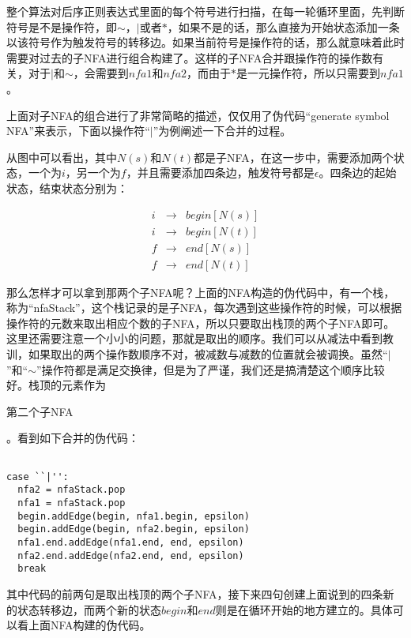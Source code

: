 整个算法对后序正则表达式里面的每个符号进行扫描，在每一轮循环里面，先判断符号是不是操作符，即$\sim$，$|$或者$*$，如果不是的话，那么直接为开始状态添加一条以该符号作为触发符号的转移边。如果当前符号是操作符的话，那么就意味着此时需要对过去的子NFA进行组合构建了。这样的子NFA合并跟操作符的操作数有关，对于$|$和$\sim$，会需要到$nfa1$和$nfa2$，而由于$*$是一元操作符，所以只需要到$nfa1$。

上面对子NFA的组合进行了非常简略的描述，仅仅用了伪代码“generate symbol NFA”来表示，下面以操作符“$|$”为例阐述一下合并的过程。



从图中可以看出，其中$N(s)$和$N(t)$都是子NFA，在这一步中，需要添加两个状态，一个为$i$，另一个为$f$，并且需要添加四条边，触发符号都是$\epsilon$。四条边的起始状态，结束状态分别为：

\begin{center}
\begin{eqnarray*}
     i & \rightarrow & begin[N(s)] \\
     i & \rightarrow & begin[N(t)] \\
     f & \rightarrow & end[N(s)] \\
     f & \rightarrow & end[N(t)] 
\end{eqnarray*}
\end{center}

\newpage

那么怎样才可以拿到那两个子NFA呢？上面的NFA构造的伪代码中，有一个栈，称为“nfaStack”，这个栈记录的是子NFA，每次遇到这些操作符的时候，可以根据操作符的元数来取出相应个数的子NFA，所以只要取出栈顶的两个子NFA即可。这里还需要注意一个小小的问题，那就是取出的顺序。我们可以从减法中看到教训，如果取出的两个操作数顺序不对，被减数与减数的位置就会被调换。虽然“$|$”和“$\sim$”操作符都是满足交换律，但是为了严谨，我们还是搞清楚这个顺序比较好。栈顶的元素作为\begin{bfseries}第二个子NFA\end{bfseries}。看到如下合并的伪代码：

\begin{verbatim}

case ``|'':
  nfa2 = nfaStack.pop
  nfa1 = nfaStack.pop
  begin.addEdge(begin, nfa1.begin, epsilon)
  begin.addEdge(begin, nfa2.begin, epsilon)
  nfa1.end.addEdge(nfa1.end, end, epsilon)
  nfa2.end.addEdge(nfa2.end, end, epsilon)
  break

\end{verbatim}

其中代码的前两句是取出栈顶的两个子NFA，接下来四句创建上面说到的四条新的状态转移边，而两个新的状态$begin$和$end$则是在循环开始的地方建立的。具体可以看上面NFA构建的伪代码。


